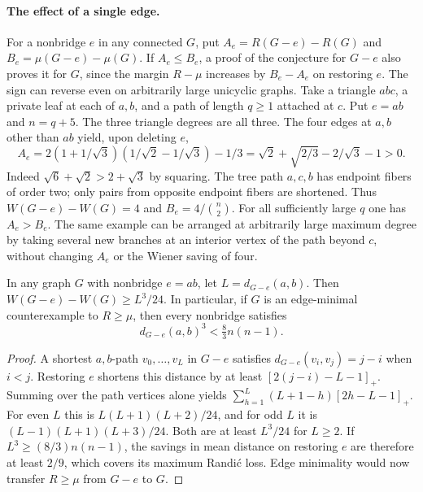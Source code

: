 \documentclass[11pt,a4paper]{article}
\begin{document}
\paragraph{The effect of a single edge.}
For a nonbridge $e$ in any connected $G$, put
$A_e=R(G-e)-R(G)$ and $B_e=\mu(G-e)-\mu(G)$. If $A_e\le B_e$, a proof
of the conjecture for $G-e$ also proves it for $G$, since the margin
$R-\mu$ increases by $B_e-A_e$ on restoring $e$. The sign can reverse
even on arbitrarily large unicyclic graphs. Take a triangle $abc$, a
private leaf at each of $a,b$, and a path of length $q\ge1$ attached at
$c$. Put $e=ab$ and $n=q+5$. The three triangle degrees are all three.
The four edges at $a,b$ other than $ab$ yield, upon deleting $e$,
\[
 A_e=2(1+1/\sqrt3)(1/\sqrt2-1/\sqrt3)-1/3
     =\sqrt2+\sqrt{2/3}-2/\sqrt3-1>0 .
\]
Indeed $\sqrt6+\sqrt2>2+\sqrt3$ by squaring. The tree path $a,c,b$
has endpoint fibers of order two; only pairs from opposite endpoint
fibers are shortened. Thus $W(G-e)-W(G)=4$ and $B_e=4/\binom n2$.
For all sufficiently large $q$ one has $A_e>B_e$. The same example
can be arranged at arbitrarily large maximum degree by taking several
new branches at an interior vertex of the path beyond $c$, without
changing $A_e$ or the Wiener saving of four.
\begin{corollary}\label{p07-cor:longnonbridge}
In any graph $G$ with nonbridge $e=ab$, let $L=d_{G-e}(a,b)$. Then
$W(G-e)-W(G)\ge L^3/24$. In particular, if $G$ is an edge-minimal
counterexample to $R\ge\mu$, then every nonbridge satisfies
\[
 d_{G-e}(a,b)^3<\tfrac83 n(n-1).
\]
\end{corollary}
\begin{proof}
A shortest $a,b$-path $v_0,\ldots,v_L$ in $G-e$ satisfies
$d_{G-e}(v_i,v_j)=j-i$ when $i<j$. Restoring $e$ shortens this
distance by at least $[2(j-i)-L-1]_+$. Summing over the path vertices
alone yields $\sum_{h=1}^L(L+1-h)[2h-L-1]_+$. For even $L$ this is
$L(L+1)(L+2)/24$, and for odd $L$ it is $(L-1)(L+1)(L+3)/24$.
Both are at least $L^3/24$ for $L\ge2$. If $L^3\ge (8/3)n(n-1)$,
the savings in mean distance on restoring $e$ are therefore at least
$2/9$, which covers its maximum Randi\'c loss. Edge minimality would now
transfer $R\ge\mu$ from $G-e$ to $G$.
\end{proof}
\end{document}
